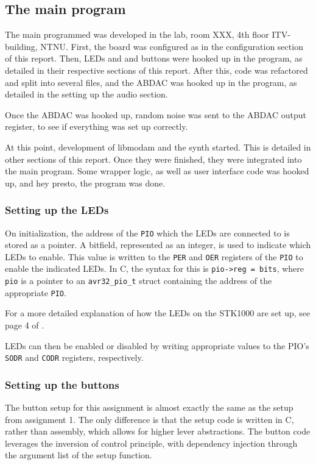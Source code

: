 \subsection{The main program}

The main programmed was developed in the lab, room XXX, 4th floor ITV-building, NTNU.
First, the board was configured as in the configuration section of this report.
Then, LEDs and and buttons were hooked up in the program, as detailed in their respective sections of this report.
After this, code was refactored and split into several files, and the ABDAC was hooked up in the program, as detailed in the setting up the audio section.

Once the ABDAC was hooked up, random noise was sent to the ABDAC output register, to see if everything was set up correctly.

At this point, development of libmodam and the synth started. This is detailed in other sections of this report. Once they were finished, they were integrated into the main program.
Some wrapper logic, as well as user interface code was hooked up, and hey presto, the program was done.


\subsubsection{Setting up the LEDs}
	On initialization, the address of the \texttt{PIO} which the LEDs are connected to is stored as a pointer.
	A bitfield, represented as an integer, is used to indicate which LEDs to enable.
	This value is written to the \texttt{PER} and \texttt{OER} registers of the \texttt{PIO} to enable the indicated LEDs.
	In C, the syntax for this is \texttt{pio->reg = bits}, where \texttt{pio} is a pointer to an \texttt{avr32_pio_t} struct containing the address of the appropriate \texttt{PIO}.

	For a more detailed explanation of how the LEDs on the STK1000 are set up, see page 4 of \cite{tdt4258-1}.

	LEDs can then be enabled or disabled by writing appropriate values to the PIO's \texttt{SODR} and \texttt{CODR} registers, respectively.
	
\subsubsection{Setting up the buttons}

The button setup for this assignment is almost exactly the same as the setup from assignment 1\cite{tdt4258-1}.
The only difference is that the setup code is written in C, rather than assembly, which allows for higher lever abstractions.
The button code leverages the inversion of control principle, with dependency injection through the argument list of the setup function.

